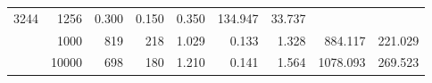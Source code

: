 \begin{table}
\begin{tabular}{rrrrrrrrr}
							     3244  & 1256  
	                           & 0.300 & 0.150 & 0.350
	                           & 134.947 & 33.737  \\
	                
	            
					 &  
					 
					\multirow{ 1 }{*}{ 1000 } &
					
						
							    
							     819  & 218  
	                           & 1.029 & 0.133 & 1.328
	                           & 884.117 & 221.029  \\
	                
	            
					 &  
					 
					\multirow{ 1 }{*}{ 10000 } &
					
						
							    
							     698  & 180  
	                           & 1.210 & 0.141 & 1.564
	                           & 1078.093 & 269.523  \\
	                
	            
	        

\hline

\end{tabular}
\end{table}
\clearpage


	    

